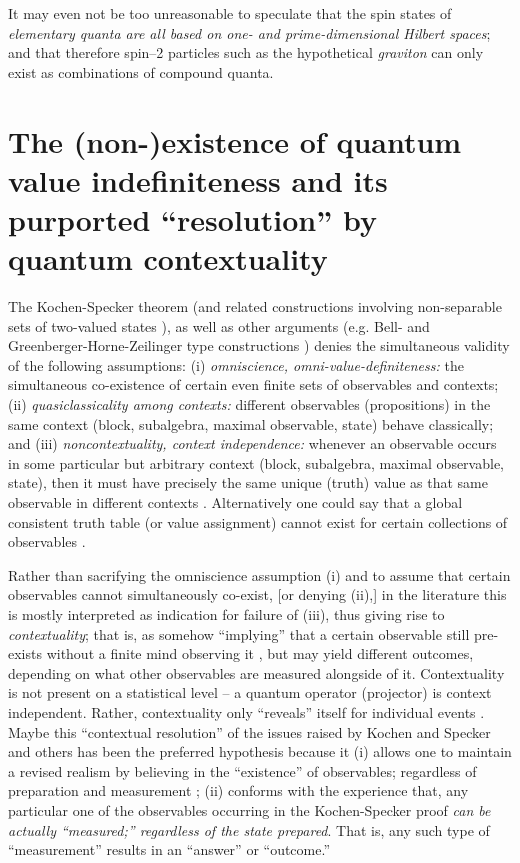 \documentclass[%
  preprint,
 showpacs,
 showkeys,
 preprintnumbers,
 amsmath,amssymb,
 aps,
   pra,
  longbibliography,
 ]{revtex4-1}
\begin{document}
It may even not be too unreasonable to speculate that the spin states of
{\em elementary quanta are all based on one- and prime-dimensional Hilbert spaces}; and that therefore spin--2 particles such as the hypothetical {\em graviton} can only exist as
combinations of compound quanta.


\section{The (non-)existence of quantum value indefiniteness and its purported ``resolution'' by quantum contextuality}

The Kochen-Specker theorem (and related constructions involving non-separable sets of two-valued states \cite[$\Gamma_3$]{kochen1}),
as well as other arguments (e.g. Bell- and Greenberger-Horne-Zeilinger type constructions \cite{mermin-93})
denies the simultaneous validity of the following assumptions:
(i) {\em omniscience, omni-value-definiteness:}  the simultaneous co-existence of certain even finite sets of observables and contexts;
(ii) {\em quasiclassicality among contexts:} different observables (propositions)  in the same context (block, subalgebra, maximal observable, state) behave classically; and
(iii) {\em noncontextuality, context independence:} whenever
an observable occurs in some particular but arbitrary context (block, subalgebra, maximal observable, state),
then it must have precisely the same unique (truth) value
as that same observable in different contexts \cite{svozil-2008-ql}.
Alternatively one could say that a global consistent truth table (or value assignment)
cannot exist for certain collections of observables \cite{peres222,svozil_2010-pc09,svozil-2011-enough}.

Rather than sacrifying the omniscience assumption (i)
and to assume that certain observables cannot simultaneously co-exist,
[or denying (ii),]
in the literature \cite{bohr-1949,bell-66,hey-red,redhead}
this is mostly interpreted as indication for failure of (iii),
thus giving rise to {\em contextuality};
that is, as somehow ``implying'' that a certain observable still pre-exists without a finite mind observing it \cite{stace}, but may yield different outcomes,
depending on what other observables are measured alongside of it.
Contextuality is not present on a statistical level -- a quantum operator (projector) is context independent.
Rather, contextuality only ``reveals'' itself for individual events \cite{svozil:040102,svozil_2010-pc09,svozil-2011-enough}.
Maybe this ``contextual resolution'' of the issues raised by Kochen and Specker and others
has been the preferred hypothesis because it
(i) allows one to maintain a revised realism by believing in the ``existence'' of observables;
regardless of preparation and measurement  \cite{stace1};
(ii) conforms with the experience that,  any particular one of the observables occurring in the
Kochen-Specker proof {\em can be actually ``measured;'' regardless of the state prepared}.
That is,
any such type of ``measurement'' results in an ``answer'' or ``outcome.''
\end{document}
